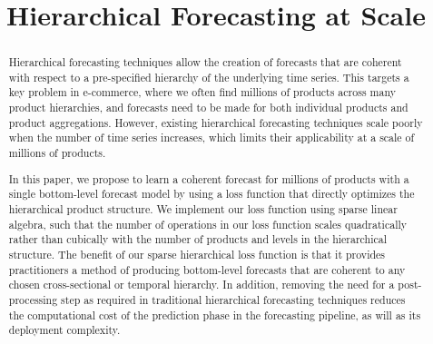 \documentclass[preprint, 3p, times, twocolumn]{elsarticle}
\begin{document}
\begin{frontmatter}

\title{Hierarchical Forecasting at Scale}

\author{
}



\begin{abstract}
  Hierarchical forecasting techniques allow the creation of forecasts that are coherent with respect to a pre-specified hierarchy of the underlying time series. This targets a key problem in e-commerce, where we often find millions of products across many product hierarchies, and forecasts need to be made for both individual products and product aggregations. However, existing hierarchical forecasting techniques scale poorly when the number of time series increases, which limits their applicability at a scale of millions of products. 
  
  In this paper, we propose to learn a coherent forecast for millions of products with a single bottom-level forecast model by using a loss function that directly optimizes the hierarchical product structure. We implement our loss function using sparse linear algebra, such that the number of operations in our loss function scales quadratically rather than cubically with the number of products and levels in the hierarchical structure. The benefit of our sparse hierarchical loss function is that it provides practitioners a method of producing bottom-level forecasts that are coherent to any chosen cross-sectional or temporal hierarchy. In addition, removing the need for a post-processing step as required in traditional hierarchical forecasting techniques reduces the computational cost of the prediction phase in the forecasting pipeline, as will as its deployment complexity.  
  

\end{abstract}
\end{frontmatter}
\end{document}
